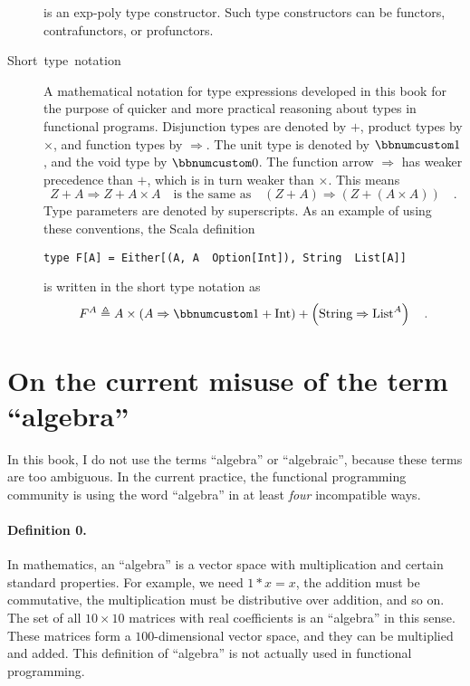 \begin{description}
is an exp-poly type constructor. Such type constructors can be functors,
contrafunctors, or profunctors.
\item [{\index{short type notation}Short~type~notation}] A mathematical
notation for type expressions developed in this book for the purpose
of quicker and more practical reasoning about types in functional
programs. Disjunction types are denoted by $+$, product types by
$\times$, and function types by $\Rightarrow$. The unit type is
denoted by $\bbnum 1$, and the void type by $\bbnum 0$. The function
arrow $\Rightarrow$ has weaker precedence than $+$, which is in
turn weaker than $\times$. This means
\[
Z+A\Rightarrow Z+A\times A\quad\text{is the same as}\quad\left(Z+A\right)\Rightarrow\left(Z+\left(A\times A\right)\right)\quad.
\]
 Type parameters are denoted by superscripts. As an example of using
these conventions, the Scala definition\texttt{}
\begin{lstlisting}
type F[A] = Either[(A, A  Option[Int]), String  List[A]]
\end{lstlisting}
is written in the short type notation as 
\[
F^{A}\triangleq A\times\left(A\Rightarrow\bbnum 1+\text{Int}\right)+\left(\text{String}\Rightarrow\text{List}^{A}\right)\quad.
\]
\end{description}

\section{On the current misuse of the term ``algebra''}

In this book, I do not use the terms ``algebra''
or ``algebraic'', because these terms are too
ambiguous. In the current practice, the functional programming community
is using the word ``algebra'' in at least \emph{four} incompatible
ways.

\paragraph{Definition 0.}

In mathematics, an “algebra” is a vector space with multiplication
and certain standard properties. For example, we need $1*x=x$, the
addition must be commutative, the multiplication must be distributive
over addition, and so on. The set of all $10\times10$ matrices with
real coefficients is an “algebra” in this sense. These matrices form
a $100$-dimensional vector space, and they can be multiplied and
added. This definition of ``algebra'' is not actually used in functional
programming.

